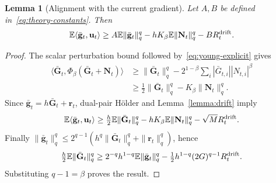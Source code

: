 \documentclass{article}
\newtheorem{lemma}{Lemma}
\begin{document}
\begin{lemma}[Alignment with the current gradient]\label{lemma:alignment}
Let $A,B$ be defined in~\eqref{eq:theory-constants}. Then
\begin{equation}\label{eq:alignment-correct}
\mathbb E\langle\bar{\mathbf{g}}_t,\mathbf{u}_t\rangle
\ge A\mathbb E\|\bar{\mathbf{g}}_t\|_q^q
-hK_\beta\mathbb E\|\mathbf{N}_t\|_q^q-BR_t^{\rm drift}.
\end{equation}
\end{lemma}
\begin{proof}
The scalar perturbation bound followed by~\eqref{eq:young-explicit} gives
\begin{align}
\langle\bar{\mathbf{G}}_t,\Phi_\beta(\bar{\mathbf{G}}_t+\mathbf{N}_t)\rangle
&\ge\|\bar{\mathbf{G}}_t\|_q^q-2^{1-\beta}\sum_i|\bar G_{t,i}||N_{t,i}|^\beta\nonumber\\
&\ge\tfrac12\|\bar{\mathbf{G}}_t\|_q^q-K_\beta\|\mathbf{N}_t\|_q^q.
\end{align}
Since $\bar{\mathbf{g}}_t=h\bar{\mathbf{G}}_t+\mathbf{r}_t$, dual-pair H\"older and Lemma~\ref{lemma:drift} imply
\begin{equation}
\mathbb E\langle\bar{\mathbf{g}}_t,\mathbf{u}_t\rangle
\ge\tfrac h2\mathbb E\|\bar{\mathbf{G}}_t\|_q^q-hK_\beta\mathbb E\|\mathbf{N}_t\|_q^q-\sqrt M R_t^{\rm drift}.
\end{equation}
Finally $\|\bar{\mathbf{g}}_t\|_q^q\le2^{q-1}(h^q\|\bar{\mathbf{G}}_t\|_q^q+\|\mathbf{r}_t\|_q^q)$, hence
\begin{equation}
\tfrac h2\mathbb E\|\bar{\mathbf{G}}_t\|_q^q
\ge2^{-q}h^{1-q}\mathbb E\|\bar{\mathbf{g}}_t\|_q^q
-\tfrac12h^{1-q}(2G)^{q-1}R_t^{\rm drift}.
\end{equation}
Substituting $q-1=\beta$ proves the result.
\end{proof}
\end{document}
